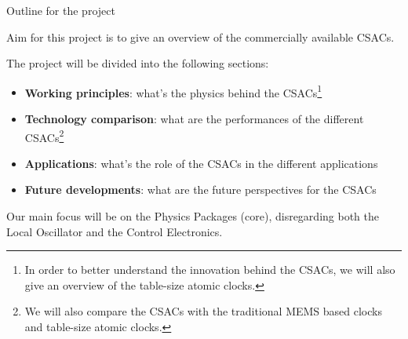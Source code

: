 \begin{frame}{Outline for the project}

    Aim for this project is to give an overview of the commercially available CSACs.

    The project will be divided into the following sections:

    \begin{itemize}
        \item \textbf{Working principles}: what's the physics behind the CSACs\footnote{In order to better understand the innovation behind the CSACs, we will also give an overview of the table-size atomic clocks.}
        \item \textbf{Technology comparison}: what are the performances of the different CSACs\footnote{We will also compare the CSACs with the traditional MEMS based clocks and table-size atomic clocks.}
        \item \textbf{Applications}: what's the role of the CSACs in the different applications
        \item \textbf{Future developments}: what are the future perspectives for the CSACs
    \end{itemize}

    Our main focus will be on the Physics Packages (core), disregarding both the Local Oscillator and the Control Electronics.

\end{frame}
